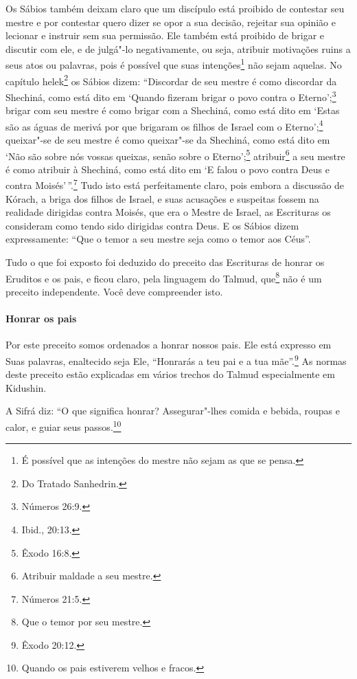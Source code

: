 \begin{multicols}{2}
Os Sábios também deixam claro que um discípulo está proibido de
contestar seu mestre e por contestar quero dizer se opor a sua decisão,
rejeitar sua opinião e lecionar e instruir sem sua permissão. Ele também
está proibido de brigar e discutir com ele, e de julgá"-lo negativamente,
ou seja, atribuir motivações ruins a seus atos ou palavras, pois é
possível que suas intenções\footnote{É possível que as intenções do mestre não sejam as que se pensa.} não
sejam aquelas. No capítulo helek\starr\footnote{Do Tratado Sanhedrin.} os Sábios
dizem: ``Discordar de seu mestre
é como discordar da Shechiná\starr, como está dito em `Quando fizeram brigar
o povo contra o Eterno';\footnote{Números 26:9.} brigar com seu mestre é como
brigar com a Shechiná\starr, como está dito em `Estas são as águas de merivá\starr{}
por que brigaram os filhos de Israel com o Eterno';\footnote{Ibid., 20:13.}
queixar"-se de seu mestre
é como queixar"-se da Shechiná\starr, como está dito em `Não são sobre nós
vossas queixas, senão sobre o Eterno';\footnote{Êxodo 16:8.}
atribuir\footnote{Atribuir maldade a seu mestre.} a seu mestre é como
atribuir à Shechiná\starr, como está dito em `E falou o povo contra Deus e
contra Moisés'\,''.\footnote{Números 21:5.} Tudo isto está perfeitamente claro, pois
embora a discussão de Kórach\starr, a briga dos filhos de Israel, e suas
acusações e suspeitas fossem na realidade dirigidas contra Moisés, que
era o Mestre de Israel, as Escrituras os consideram como tendo sido
dirigidas contra Deus. E os Sábios dizem expressamente: ``Que o temor a
seu mestre seja como o temor aos Céus''.

Tudo o que foi exposto foi deduzido do preceito das Escrituras de honrar
os Eruditos e os pais, e ficou claro, pela linguagem do Talmud\starr,
que\footnote{Que o temor por seu mestre.} não é um preceito independente. Você deve
compreender isto.

\paragraph{Honrar os pais}

Por este preceito somos ordenados a honrar nossos pais. Ele está
expresso em Suas palavras, enaltecido seja Ele, ``Honrarás a teu pai e a
tua mãe''.\footnote{Êxodo 20:12.} As normas deste preceito estão explicadas em
vários trechos do Talmud\starr{} especialmente em Kidushin\starr.

A Sifrá\starr{} diz: ``O que significa honrar? Assegurar"-lhes comida e bebida, roupas e calor, e guiar seus passos.\footnote{Quando os pais estiverem velhos e fracos.}



\end{multicols}
